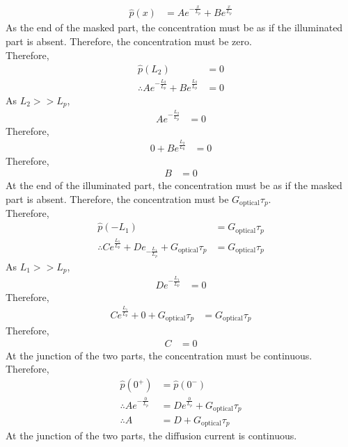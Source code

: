 \documentclass[titlepage, fleqn, a4paper, 12pt, twoside]{article}
\theoremstyle{definition}
\theoremstyle{theorem}
\begin{document}
\begin{solution}
	\begin{align*}
		\hat{p}(x) &= A e^{-\frac{x}{L_p}} + B e^{\frac{x}{L_p}}
	\end{align*}
	As the end of the masked part, the concentration must be as if the illuminated part is absent.
	Therefore, the concentration must be zero.\\
	Therefore,
	\begin{align*}
		\hat{p}(L_2) &= 0\\
		\therefore A e^{-\frac{L_2}{L_p}} + B e^{\frac{L_2}{L_p}} &= 0
	\end{align*}
	As $L_2 >> L_p$,
	\begin{align*}
		A e^{-\frac{L_2}{L_p}} &= 0
	\end{align*}
	Therefore,
	\begin{align*}
		0 + B e^{\frac{L_2}{L_0}} &= 0
	\end{align*}
	Therefore,
	\begin{align*}
		B &= 0
	\end{align*}
	At the end of the illuminated part, the concentration must be as if the masked part is absent.
	Therefore, the concentration must be $G_{\text{optical}} \tau_p$.\\
	Therefore,
	\begin{align*}
		\hat{p}(-L_1) &= G_{\text{optical}} \tau_p\\
		\therefore C e^{\frac{L_1}{L_p}} + D e_{-\frac{L_1}{L_p}} + G_{\text{optical}} \tau_p &= G_{\text{optical}} \tau_p
	\end{align*}
	As $L_1 >> L_p$,
	\begin{align*}
		D e^{-\frac{L_1}{L_p}} &= 0
	\end{align*}
	Therefore,
	\begin{align*}
		C e^{\frac{L_1}{L_p}} + 0 + G_{\text{optical}} \tau_p &= G_{\text{optical}} \tau_p
	\end{align*}
	Therefore,
	\begin{align*}
		C &= 0
	\end{align*}
	At the junction of the two parts, the concentration must be continuous.\\
	Therefore,
	\begin{align*}
		\hat{p}(0^+) &= \hat{p}(0^-)\\
		\therefore A e^{-\frac{0}{L_p}} &= D e^{\frac{0}{L_p}} + G_{\text{optical}} \tau_p\\
		\therefore A &= D + G_{\text{optical}} \tau_p
	\end{align*}
	At the junction of the two parts, the diffusion current is continuous.

\end{solution}
\end{document}
